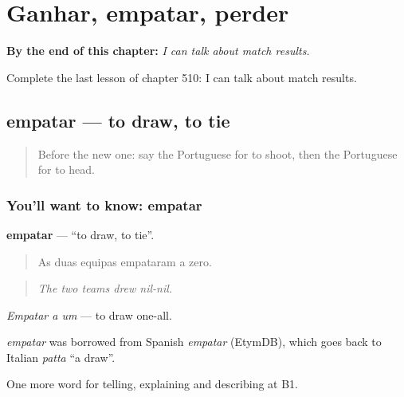 
\chapter{Ganhar, empatar, perder}
\label{ch:pt-ganhar-empatar-perder}

\begin{chapteropening}
\textbf{By the end of this chapter:} \emph{I can talk about match results.}

Complete the last lesson of chapter 510: I can talk about match results.
\end{chapteropening}

\section[empatar]{empatar — to draw, to tie}

\label{lesson:PT-C510-empatar}



\begin{quote}
Before the new one: say the Portuguese for to shoot, then the Portuguese for to head.
\end{quote}

\subsection*{You'll want to know: empatar}
\textbf{empatar} — \textquotedblleft{}to draw, to tie\textquotedblright{}.

\begin{quote}
As duas equipas empataram a zero.
\end{quote}

\begin{quote}
\emph{The two teams drew nil-nil.}
\end{quote}

\emph{Empatar a um} — to draw one-all.

\begin{cousinweb}
\emph{empatar} was borrowed from Spanish \emph{empatar} (EtymDB), which goes back to Italian \emph{patta} \textquotedblleft{}a draw\textquotedblright{}.
\end{cousinweb}

\begin{grammarlens}[title={What you've built}]
One more word for telling, explaining and describing at B1.
\end{grammarlens}

